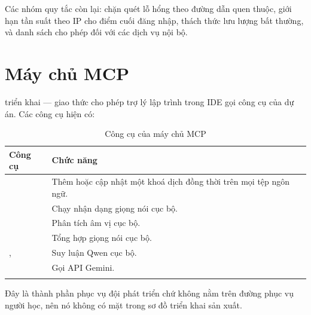 Các nhóm quy tắc còn lại: chặn quét lỗ hổng theo đường dẫn quen thuộc, giới hạn tần suất
theo IP cho điểm cuối đăng nhập, thách thức lưu lượng bất thường, và danh sách cho phép
đối với các dịch vụ nội bộ.

\section{Máy chủ MCP}

 triển khai  — giao thức cho phép trợ lý lập
trình trong IDE gọi công cụ của dự án. Các công cụ hiện có:

\begin{longtable}{L{4.4cm} L{9.2cm}}
\toprule
\textbf{Công cụ} & \textbf{Chức năng}\\
\midrule
\endhead
{} & Thêm hoặc cập nhật một khoá dịch đồng thời trên mọi tệp ngôn ngữ.\\
 & Chạy nhận dạng giọng nói cục bộ.\\
 & Phân tích âm vị cục bộ.\\
 & Tổng hợp giọng nói cục bộ.\\
,  & Suy luận Qwen cục bộ.\\
 & Gọi API Gemini.\\
\bottomrule
\caption{Công cụ của máy chủ MCP}
\end{longtable}

Đây là thành phần phục vụ đội phát triển chứ không nằm trên đường phục vụ người học, nên
nó không có mặt trong sơ đồ triển khai sản xuất.
